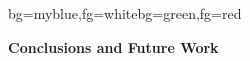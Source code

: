 {
\begin{frame}[plain]

\begin{variableblock}{}{bg=myblue,fg=white}{bg=green,fg=red}
\begin{center}
\textbf{Conclusions and Future Work}
\end{center}
\end{variableblock}

\end{frame}
}